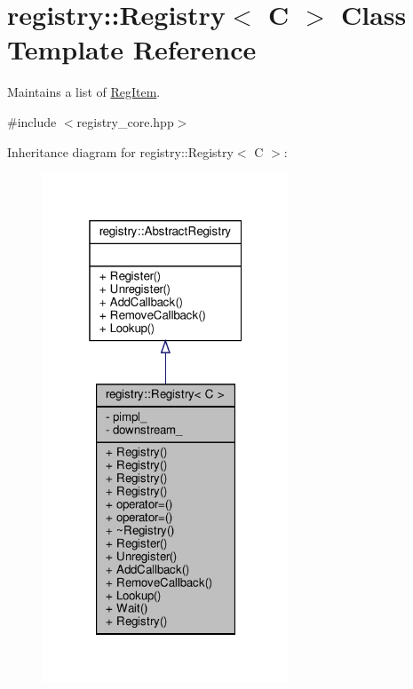 \hypertarget{classregistry_1_1Registry}{}\section{registry\+:\+:Registry$<$ C $>$ Class Template Reference}
\label{classregistry_1_1Registry}


Maintains a list of \hyperlink{classregistry_1_1RegItem}{Reg\+Item}.  




{\ttfamily \#include $<$registry\+\_\+core.\+hpp$>$}



Inheritance diagram for registry\+:\+:Registry$<$ C $>$\+:\nopagebreak
\begin{figure}[H]
\begin{center}
\leavevmode
\includegraphics[width=208pt]{classregistry_1_1Registry__inherit__graph}
\end{center}
\end{figure}


